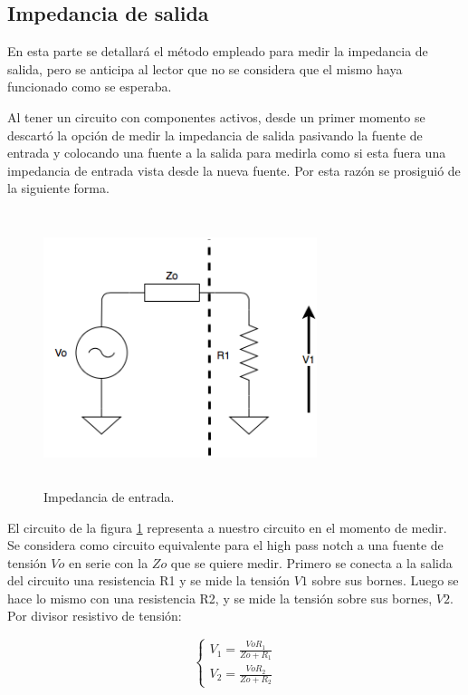 \subsection{Impedancia de salida}

En esta parte se detallar\'a el m\'etodo empleado para medir la impedancia de salida, pero se anticipa al lector que no se considera que el mismo haya funcionado como se esperaba. 

Al tener un circuito con componentes activos, desde un primer momento se descart\'o la opci\'on de medir la impedancia de salida pasivando la fuente de entrada y colocando una fuente a la salida para medirla como si esta fuera una impedancia de entrada vista desde la nueva fuente. Por esta raz\'on se prosigui\'o de la siguiente forma.

\begin{figure}[H] %
	\centering
	\includegraphics[width=8cm,height=8cm,keepaspectratio]{../EJ1/00GRAFICOS/zout.png}
	\caption{Impedancia de entrada.}
	\label{zout}
\end{figure}

El circuito de la figura \ref{zout} representa a nuestro circuito en el momento de medir. Se considera como circuito equivalente para el high pass notch a una fuente de tensi\'on $Vo$ en serie con la $Zo$ que se quiere medir. Primero se conecta a la salida del circuito una resistencia R1 y se mide la tensi\'on $V1$ sobre sus bornes. Luego se hace lo mismo con una resistencia R2, y se mide la tensi\'on sobre sus bornes, $V2$. Por divisor resistivo de tensi\'on:

\begin{equation}
\begin{cases}
	V_1 = \frac{Vo R_1}{Zo + R_1}\\
	V_2 = \frac{Vo R_2}{Zo + R_2}
\end{cases}
\label{v1v2}
\end{equation}


